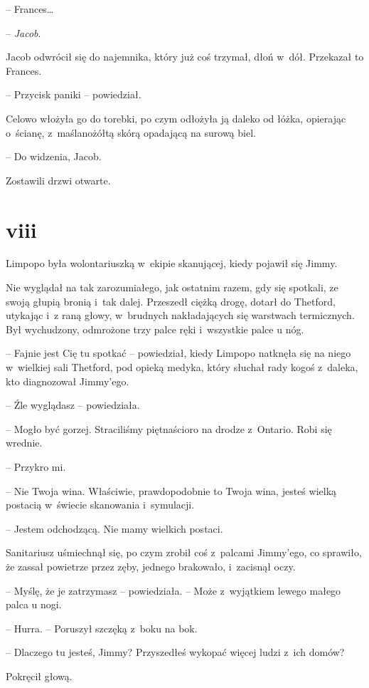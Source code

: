 \documentclass[oneside,polish,11pt,sfheadings]{mwbk}
\begin{document}
-- Frances\ldots 

-- \textit{Jacob}.

Jacob odwrócił się do najemnika, który już coś trzymał, dłoń w~dół.
Przekazał to Frances. 

-- Przycisk paniki -- powiedział.

Celowo włożyła go do torebki, po czym odłożyła ją daleko od łóżka,
opierając o~ścianę, z~maślanożółtą skórą opadającą na surową biel. 

-- Do
widzenia, Jacob.

Zostawili drzwi otwarte.

\chapter*{viii}

Limpopo była wolontariuszką w~ekipie skanującej, kiedy pojawił się
Jimmy.

Nie wyglądał na tak zarozumiałego, jak ostatnim razem, gdy się spotkali,
ze swoją głupią bronią i~tak dalej. Przeszedł ciężką drogę, dotarł do
Thetford, utykając i~z raną głowy, w~brudnych nakładających się
warstwach termicznych. Był wychudzony, odmrożone trzy palce ręki i~wszystkie palce u nóg.

-- Fajnie jest Cię tu spotkać -- powiedział, kiedy Limpopo natknęła się na
niego w~wielkiej sali Thetford, pod opieką medyka, który słuchał rady
kogoś z~daleka, kto diagnozował Jimmy'ego.

-- Źle wyglądasz -- powiedziała.

-- Mogło być gorzej. Straciliśmy piętnaścioro na drodze z~Ontario. Robi
się wrednie.

-- Przykro mi.

-- Nie Twoja wina. Właściwie, prawdopodobnie to Twoja wina, jesteś wielką
postacią w~świecie skanowania i~symulacji.

-- Jestem odchodzącą. Nie mamy wielkich postaci.

Sanitariusz uśmiechnął się, po czym zrobił coś z~palcami Jimmy'ego, co
sprawiło, że zassał powietrze przez zęby, jednego brakowało, i~zacisnął
oczy.

-- Myślę, że je zatrzymasz -- powiedziała. -- Może z~wyjątkiem lewego
małego palca u nogi.

-- Hurra. -- Poruszył szczęką z~boku na bok.

-- Dlaczego tu jesteś, Jimmy? Przyszedłeś wykopać więcej ludzi z~ich
domów?

Pokręcił głową. 
\end{document}
